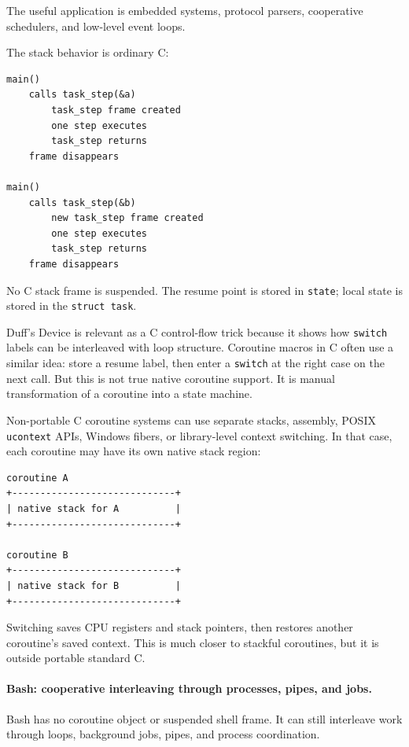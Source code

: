 The useful application is embedded systems, protocol parsers, cooperative schedulers, and low-level event loops.

The stack behavior is ordinary C:

\begin{verbatim}
main()
    calls task_step(&a)
        task_step frame created
        one step executes
        task_step returns
    frame disappears

main()
    calls task_step(&b)
        new task_step frame created
        one step executes
        task_step returns
    frame disappears
\end{verbatim}

No C stack frame is suspended. The resume point is stored in \texttt{state}; local state is stored in the \texttt{struct task}.

Duff's Device is relevant as a C control-flow trick because it shows how \texttt{switch} labels can be interleaved with loop structure. Coroutine macros in C often use a similar idea: store a resume label, then enter a \texttt{switch} at the right case on the next call. But this is not true native coroutine support. It is manual transformation of a coroutine into a state machine.

Non-portable C coroutine systems can use separate stacks, assembly, POSIX \texttt{ucontext} APIs, Windows fibers, or library-level context switching. In that case, each coroutine may have its own native stack region:

\begin{verbatim}
coroutine A
+-----------------------------+
| native stack for A          |
+-----------------------------+

coroutine B
+-----------------------------+
| native stack for B          |
+-----------------------------+
\end{verbatim}

Switching saves CPU registers and stack pointers, then restores another coroutine's saved context. This is much closer to stackful coroutines, but it is outside portable standard C.

\paragraph{Bash: cooperative interleaving through processes, pipes, and jobs.}

Bash has no coroutine object or suspended shell frame. It can still interleave work through loops, background jobs, pipes, and process coordination.

